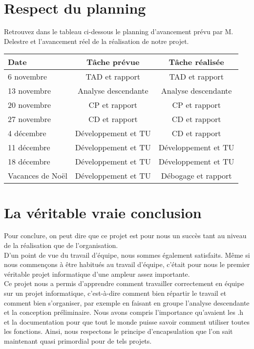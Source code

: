 	\section{Respect du planning}
	Retrouvez dans le tableau ci-dessous le planning d'avancement prévu par M. Delestre et l'avancement réel de la réalisation de notre projet.
	\begin{center}
	\begin{tabular}
	{ |				l		||		c			|		 c		|} \hline
		Date				& Tâche prévue 				& Tâche réalisée \\ \hline \hline
		6 novembre			& TAD et rapport			& TAD et rapport	\\ \hline
		13 novembre			& Analyse descendante		& Analyse descendante	\\ \hline
		20 novembre			& CP et rapport				& CP et rapport	\\ \hline
		27 novembre			& CD et rapport				& CD et rapport	\\ \hline
		4 décembre			& Développement et TU		& CD et rapport	\\ \hline
		11 décembre			& Développement et TU		& Développement et TU	\\ \hline
		18 décembre			& Développement et TU		& Développement et TU	\\ \hline
		Vacances de Noël	& Développement et TU		& Débogage et rapport	\\ \hline
	\end{tabular}
	\end{center}

	\section{La véritable vraie conclusion}
	Pour conclure, on peut dire que ce projet est pour nous un succès tant au niveau de la réalisation que de l'organisation.\\

	D'un point de vue du travail d'équipe, nous sommes également satisfaits. Même si nous commençons à être habitués au travail d'équipe, c'était pour nous le premier véritable projet informatique d'une ampleur assez importante.\\

	Ce projet nous a permis d'apprendre comment travailler correctement en équipe sur un projet informatique, c'est-à-dire comment bien répartir le travail et comment bien s'organiser, par exemple en faisant en groupe l'analyse descendante et la conception préliminaire. Nous avons compris l'importance qu'avaient les .h et la documentation pour que tout le monde puisse savoir comment utiliser toutes les fonctions. Ainsi, nous respectons le principe d'encapsulation que l'on sait maintenant quasi primordial pour de tels projets.\\

